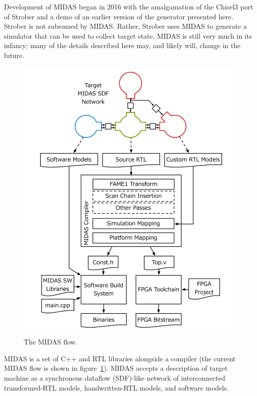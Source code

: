 Development of MIDAS began in 2016 with the amalgamation of the Chisel3 port of
Strober and a demo of an earlier version of the generator presented here.
Strober is not subsumed by MIDAS.  Rather, Strober uses MIDAS to generate a
simulator that can be used to collect target state. MIDAS is still very much in
its infancy; many of the details described here may, and likely will, change in
the future.

\begin{figure}
	\centering
	\includegraphics[width=16cm]{figures/toolchain.pdf}
    \caption{The MIDAS flow.}
	\label{fig:midas}
\end{figure}

MIDAS is a set of C++ and RTL libraries alongside a compiler (the current MIDAS
flow is shown in figure~\ref{fig:midas}). MIDAS accepts a description of target
machine as a synchronous dataflow (SDF)-like network of interconnected transformed-RTL models,
handwritten-RTL models, and software models.

